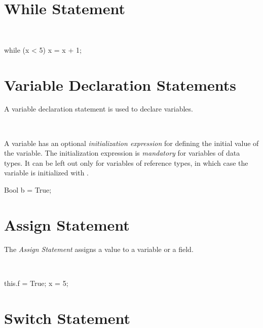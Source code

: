 \section{While Statement}

\begin{abssyntax}
\ \TRS{(}  \TRS{)}\ 
\end{abssyntax}

\begin{absexample}
while (x < 5)
   x = x + 1;
\end{absexample}

\section{Variable Declaration Statements}
A variable declaration statement is used to declare variables.

\begin{abssyntax}
  {}\ \ \ \TRS{;}
\end{abssyntax}

A variable has an optional \emph{initialization expression} for defining the initial value of the variable. The initialization expression is \emph{mandatory} for variables of data types.
It can be left out only for variables of reference types, in which case the variable is initialized with .

\begin{absexample}
Bool b = True;
\end{absexample}

\section{Assign Statement}
The \emph{Assign Statement} assigns a value to a variable or a field.

\begin{abssyntax}
  {}\ \TRS{=}\ \ \TRS{;}
               {}\ \TRS{=}\ \ \TRS{;}
\end{abssyntax}

\begin{absexample}
this.f = True;
x = 5;
\end{absexample}

\section{Switch Statement}

